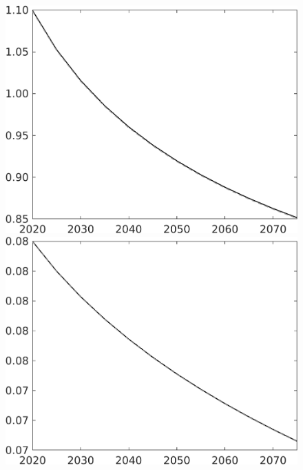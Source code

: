 \documentclass[12pt]{article}
\begin{document}
\begin{figure}[h!!]
\begin{minipage}[]{0.32\textwidth}
	\end{minipage}	
	\begin{minipage}[]{0.32\textwidth}
		\includegraphics[width=1\textwidth]{../../codding_model/own_basedOnFried/optimalPol_010922_revision/figures/all_13Sept22/CompTaul_LFBAU_Reg0_pg_spillover0_nsk0_xgr1_knspil0_sep1_countec0_GovRev0_etaa0.79_lgd0.png}
	\end{minipage}		
	\begin{minipage}[]{0.32\textwidth}
		\includegraphics[width=1\textwidth]{../../codding_model/own_basedOnFried/optimalPol_010922_revision/figures/all_13Sept22/CompTaul_LFBAU_Reg0_pepn_spillover0_nsk0_xgr1_knspil0_sep1_countec0_GovRev0_etaa0.79_lgd0.png}

\end{minipage}
\end{figure}
\end{document}
